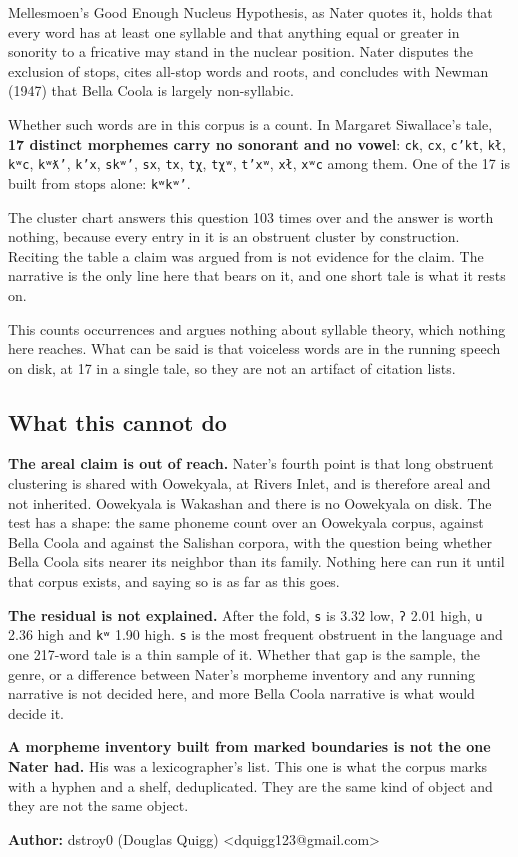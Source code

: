 Mellesmoen's Good Enough Nucleus Hypothesis, as Nater quotes it, holds that every word has at least
one syllable and that anything equal or greater in sonority to a fricative may stand in the nuclear
position. Nater disputes the exclusion of stops, cites all-stop words and roots, and concludes with
Newman (1947) that Bella Coola is largely non-syllabic.

Whether such words are in this corpus is a count. In Margaret Siwallace's tale, \textbf{17 distinct
morphemes carry no sonorant and no vowel}: \texttt{ck}, \texttt{cx}, \texttt{c'kt}, \texttt{kł},
\texttt{kʷc}, \texttt{kʷƛ'}, \texttt{k'x}, \texttt{skʷ'}, \texttt{sx}, \texttt{tx}, \texttt{tχ},
\texttt{tχʷ}, \texttt{t'xʷ}, \texttt{xł}, \texttt{xʷc} among them. One of the 17 is built from stops
alone: \texttt{kʷkʷ'}.

The cluster chart answers this question 103 times over and the answer is worth nothing, because
every entry in it is an obstruent cluster by construction. Reciting the table a claim was argued
from is not evidence for the claim. The narrative is the only line here that bears on it, and one
short tale is what it rests on.

This counts occurrences and argues nothing about syllable theory, which nothing here reaches. What can be
said is that voiceless words are in the running speech on disk, at 17 in a single tale, so they are
not an artifact of citation lists.

\subsection{What this cannot do}

\textbf{The areal claim is out of reach.} Nater's fourth point is that long obstruent clustering is
shared with Oowekyala, at Rivers Inlet, and is therefore areal and not inherited. Oowekyala is
Wakashan and there is no Oowekyala on disk. The test has a shape: the same phoneme count over an
Oowekyala corpus, against Bella Coola and against the Salishan corpora, with the question being
whether Bella Coola sits nearer its neighbor than its family. Nothing here can run it until that
corpus exists, and saying so is as far as this goes.

\textbf{The residual is not explained.} After the fold, \texttt{s} is 3.32 low, \texttt{ʔ} 2.01
high, \texttt{u} 2.36 high and \texttt{kʷ} 1.90 high. \texttt{s} is the most frequent obstruent in
the language and one 217-word tale is a thin sample of it. Whether that gap is the sample, the
genre, or a difference between Nater's morpheme inventory and any running narrative is not decided
here, and more Bella Coola narrative is what would decide it.

\textbf{A morpheme inventory built from marked boundaries is not the one Nater had.} His was a
lexicographer's list. This one is what the corpus marks with a hyphen and a shelf, deduplicated.
They are the same kind of object and they are not the same object.

\textbf{Author:} dstroy0 (Douglas Quigg) <dquigg123@gmail.com>
